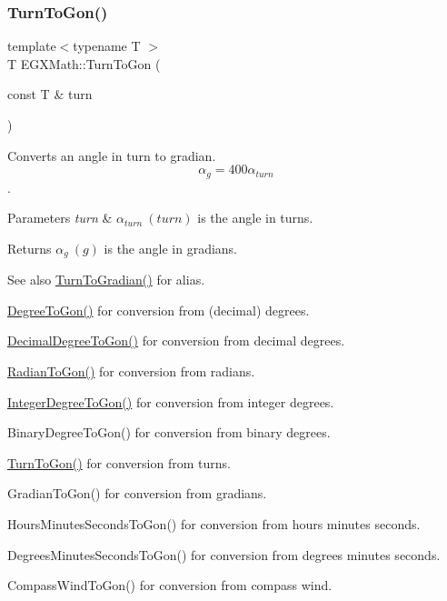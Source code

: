 \subsubsection{\texorpdfstring{Turn\+To\+Gon()}{TurnToGon()}}
{\footnotesize\ttfamily template$<$typename T $>$ \\
T E\+G\+X\+Math\+::\+Turn\+To\+Gon (\begin{DoxyParamCaption}\item[{const T \&}]{turn }\end{DoxyParamCaption})}



Converts an angle in turn to gradian. \[\alpha_{g}=400\alpha_{turn}\]. 


\begin{DoxyParams}{Parameters}
{\em turn} & $\alpha_{turn}\ (turn)$ is the angle in turns. \\
\hline
\end{DoxyParams}
\begin{DoxyReturn}{Returns}
$\alpha_{g}\ (g)$ is the angle in gradians. 
\end{DoxyReturn}
\begin{DoxySeeAlso}{See also}
\mbox{\hyperlink{group___e_g_x_math-_angle_conversions-_turn_gad6aa9bdde2cde17cec136b24ee017bba}{Turn\+To\+Gradian()}} for alias. 

\mbox{\hyperlink{group___e_g_x_math-_angle_conversions-_degree_ga87c3fab0867021e5d2501197b4db6194}{Degree\+To\+Gon()}} for conversion from (decimal) degrees. 

\mbox{\hyperlink{group___e_g_x_math-_angle_conversions-_decimal_degree_gaeb333a1ad0aeb913c025fbd1be85fcb3}{Decimal\+Degree\+To\+Gon()}} for conversion from decimal degrees. 

\mbox{\hyperlink{group___e_g_x_math-_angle_conversions-_radian_ga36912e5a810b64c271c4dafc17f4ca45}{Radian\+To\+Gon()}} for conversion from radians. 

\mbox{\hyperlink{group___e_g_x_math-_angle_conversions-_integer_degree_ga6e5be425c37ad27319f09329156c64bb}{Integer\+Degree\+To\+Gon()}} for conversion from integer degrees. 

Binary\+Degree\+To\+Gon() for conversion from binary degrees. 

\mbox{\hyperlink{group___e_g_x_math-_angle_conversions-_turn_gad81dd0bb1660ef24e28fa15b2403dec7}{Turn\+To\+Gon()}} for conversion from turns. 

Gradian\+To\+Gon() for conversion from gradians. 

Hours\+Minutes\+Seconds\+To\+Gon() for conversion from hours minutes seconds. 

Degrees\+Minutes\+Seconds\+To\+Gon() for conversion from degrees minutes seconds. 

Compass\+Wind\+To\+Gon() for conversion from compass wind. 
\end{DoxySeeAlso}
\mbox{\label{group___e_g_x_math-_angle_conversions-_turn_gad6aa9bdde2cde17cec136b24ee017bba}} 
